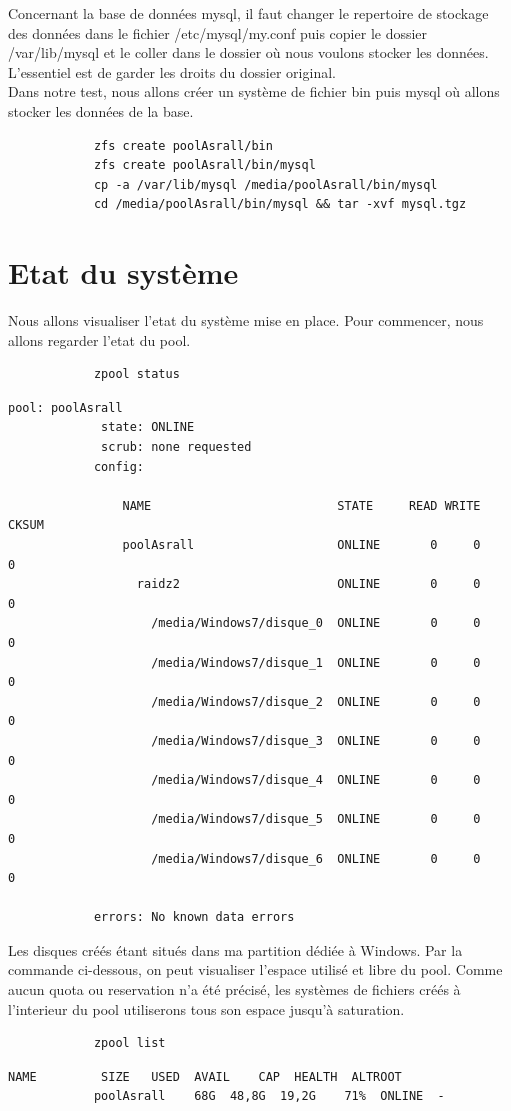 \documentclass[a4paper]{report}
\begin{document}
	Concernant la base de données mysql, il faut changer le repertoire de stockage des données dans le fichier /etc/mysql/my.conf puis copier le dossier /var/lib/mysql et le coller dans le dossier où nous voulons stocker les données. L'essentiel est de garder les droits du dossier original. \\
Dans notre test, nous allons créer un système de fichier bin puis mysql où allons stocker les données de la base.
		\begin{lstlisting}
			zfs create poolAsrall/bin
			zfs create poolAsrall/bin/mysql
			cp -a /var/lib/mysql /media/poolAsrall/bin/mysql
			cd /media/poolAsrall/bin/mysql && tar -xvf mysql.tgz
		\end{lstlisting}
	\section{Etat du système}
	Nous allons visualiser l'etat du système mise en place. Pour commencer, nous allons regarder l'etat du pool.
		\begin{lstlisting}
			zpool status
		\end{lstlisting}
		\begin{lstlisting}[backgroundcolor=\color{yellow}]
			pool: poolAsrall
			 state: ONLINE
			 scrub: none requested
			config:

				NAME                          STATE     READ WRITE CKSUM
				poolAsrall                    ONLINE       0     0     0
				  raidz2                      ONLINE       0     0     0
				    /media/Windows7/disque_0  ONLINE       0     0     0
				    /media/Windows7/disque_1  ONLINE       0     0     0
				    /media/Windows7/disque_2  ONLINE       0     0     0
				    /media/Windows7/disque_3  ONLINE       0     0     0
				    /media/Windows7/disque_4  ONLINE       0     0     0
				    /media/Windows7/disque_5  ONLINE       0     0     0
				    /media/Windows7/disque_6  ONLINE       0     0     0

			errors: No known data errors
		\end{lstlisting}
		Les disques créés étant situés dans ma partition dédiée à Windows. Par la commande ci-dessous, on peut visualiser l'espace utilisé et libre du pool. Comme aucun quota ou reservation n'a été précisé, les systèmes de fichiers créés à l'interieur du pool utiliserons tous son espace jusqu'à saturation.
		\begin{lstlisting}
			zpool list
		\end{lstlisting}
		\begin{lstlisting}[backgroundcolor=\color{yellow}]
			NAME         SIZE   USED  AVAIL    CAP  HEALTH  ALTROOT
			poolAsrall    68G  48,8G  19,2G    71%  ONLINE  -
		\end{lstlisting}
\end{document}
